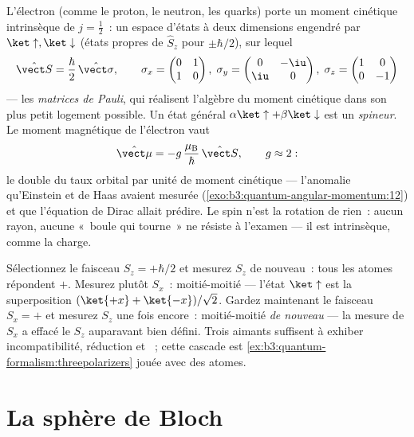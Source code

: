 \begin{definition}\label{def:b3:spin-two-level:spin}
L'électron (comme le proton, le neutron, les quarks) porte un moment
cinétique intrinsèque de $j = \tfrac12$~: un espace d'états à deux
dimensions engendré par $\ket\uparrow, \ket\downarrow$ (états propres
de $\hat S_z$ pour $\pm\hbar/2$), sur lequel
\[
\hat{\vect S} = \frac\hbar2\,\hat{\vect\sigma} , \qquad
\sigma_x = \begin{pmatrix}0&1\\1&0\end{pmatrix} ,\;
\sigma_y = \begin{pmatrix}0&-\iu\\\iu&0\end{pmatrix} ,\;
\sigma_z = \begin{pmatrix}1&0\\0&-1\end{pmatrix}
\]
--- les \emph{matrices de Pauli}, qui réalisent l'algèbre du moment
cinétique dans son plus petit logement possible. Un état général
$\alpha\ket\uparrow + \beta\ket\downarrow$ est un \emph{spineur}. Le
moment magnétique de l'électron vaut
\[
\hat{\vect\mu} = -g\,\frac{\mu_{\text{B}}}{\hbar}\,\hat{\vect S} ,
\qquad g \approx 2 :
\]
le double du taux orbital par unité de moment cinétique --- l'anomalie
qu'Einstein et de Haas avaient mesurée
(\cref{exo:b3:quantum-angular-momentum:12}) et que l'équation de Dirac
allait prédire. Le spin n'est la rotation de rien~: aucun rayon,
aucune «~boule qui tourne~» ne résiste à l'examen --- il est
intrinsèque, comme la charge.
\end{definition}

\begin{example}\label{ex:b3:spin-two-level:chained}
Sélectionnez le faisceau $S_z = +\hbar/2$ et mesurez $S_z$ de
nouveau~: tous les atomes répondent $+$. Mesurez plutôt $S_x$~:
moitié-moitié --- l'état $\ket\uparrow$ est la superposition
$(\ket{+x} + \ket{-x})/\sqrt2$. Gardez maintenant le faisceau
$S_x = +$ et mesurez $S_z$ une fois encore~: moitié-moitié
\emph{de nouveau} --- la mesure de $S_x$ a effacé le $S_z$ auparavant
bien défini. Trois aimants suffisent à exhiber incompatibilité,
réduction et ~; cette cascade est
\cref{ex:b3:quantum-formalism:threepolarizers} jouée avec des atomes.
\end{example}

\section{La sphère de Bloch}

